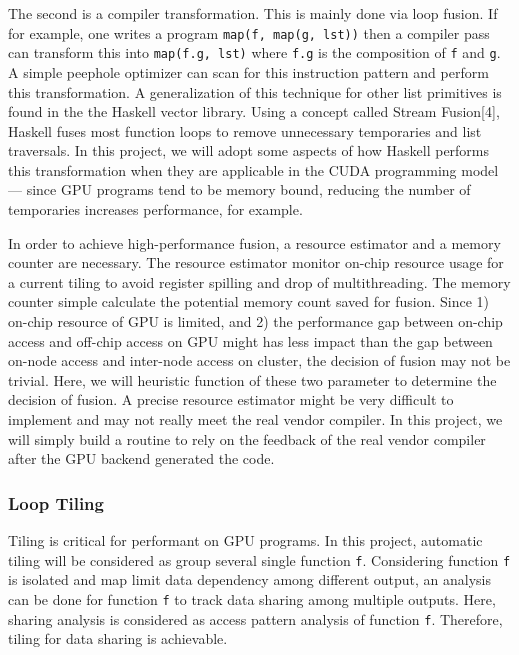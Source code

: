 The second is a compiler transformation. This is mainly done via loop
fusion. If for example, one writes a program
\texttt{map(f, map(g, lst))} then a compiler pass can transform this
into \texttt{map(f.g, lst)} where \texttt{f.g} is the composition of
\texttt{f} and \texttt{g}. A simple peephole optimizer can scan for this
instruction pattern and perform this transformation. A generalization of
this technique for other list primitives is found in the the Haskell
vector library. Using a concept called Stream Fusion{[}4{]}, Haskell
fuses most function loops to remove unnecessary temporaries and list
traversals. In this project, we will adopt some aspects of how Haskell
performs this transformation when they are applicable in the CUDA
programming model --- since GPU programs tend to be memory bound,
reducing the number of temporaries increases performance, for example.

In order to achieve high-performance fusion, a resource estimator and a
memory counter are necessary. The resource estimator monitor on-chip
resource usage for a current tiling to avoid register spilling and drop
of multithreading. The memory counter simple calculate the potential
memory count saved for fusion. Since 1) on-chip resource of GPU is
limited, and 2) the performance gap between on-chip access and off-chip
access on GPU might has less impact than the gap between on-node access
and inter-node access on cluster, the decision of fusion may not be
trivial. Here, we will heuristic function of these two parameter to
determine the decision of fusion. A precise resource estimator might be
very difficult to implement and may not really meet the real vendor
compiler. In this project, we will simply build a routine to rely on the
feedback of the real vendor compiler after the GPU backend generated the
code.

\subsubsection{Loop Tiling}\label{loop-tiling}

Tiling is critical for performant on GPU programs. In this project,
automatic tiling will be considered as group several single function
\texttt{f}. Considering function \texttt{f} is isolated and map limit
data dependency among different output, an analysis can be done for
function \texttt{f} to track data sharing among multiple outputs. Here,
sharing analysis is considered as access pattern analysis of function
\texttt{f}. Therefore, tiling for data sharing is achievable.

